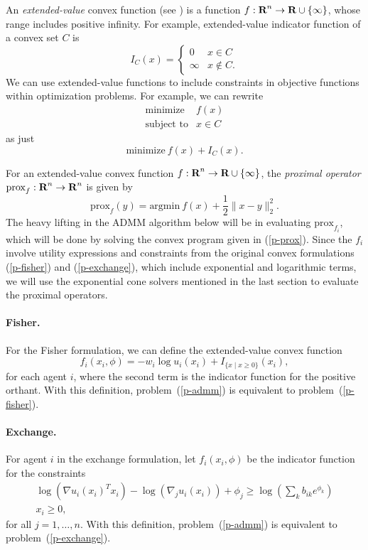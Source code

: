 \documentclass[12pt]{article}
\begin{document}
An \emph{extended-value} convex function (see \cite{BoV:04}) is a function 
$f: {\mbox{\bf R}}^n \to {\mbox{\bf R}} \cup \{\infty\}$, whose range includes
positive infinity. 
For example, extended-value indicator function of a convex set $C$ is
\[
I_C (x) =
\begin{cases}
0 & x \in C\\
\infty & x \not\in C.
\end{cases}
\]
We can use extended-value functions to include constraints in objective functions within
optimization problems. For example,
we can rewrite
\begin{equation*}
\begin{array}{ll}
\mbox{minimize} & f(x) \\
\mbox{subject to} & x \in C
\end{array}
\end{equation*}
as just 
\[
\mbox{minimize}\ f(x) + I_C(x).
\]

For an extended-value convex function
$f: {\mbox{\bf R}}^n \to {\mbox{\bf R}} \cup \{\infty\}$,
the \emph{proximal operator} \cite{parikh2013proximal}
$\mbox{prox}_{f} : {\mbox{\bf R}}^n \to {\mbox{\bf R}}^n$
is given by
\begin{equation}
\label{p-prox}
\mbox{prox}_f(y) = \mbox{argmin}\ f(x) + \frac{1}{2}\|x - y\|_2^2.
\end{equation}
The heavy lifting in the ADMM algorithm below
will be in evaluating $\mbox{prox}_{f_i}$, which will be done
by solving the convex program given in (\ref{p-prox}). Since the $f_i$ involve
utility expressions and constraints from the original convex formulations
(\ref{p-fisher}) and (\ref{p-exchange}), which include
exponential and logarithmic terms, we will use the exponential cone solvers
mentioned in the last section to evaluate the proximal operators.


\paragraph{Fisher.}
For the Fisher formulation, we can define the extended-value convex function
\[
f_i(x_i, \phi) = -w_i \log u_i(x_i) + I_{\lbrace x \mid x \geq 0 \rbrace}(x_i),
\]
for each agent $i$,
where the second term is the indicator function for the positive orthant.
With this definition, problem~(\ref{p-admm}) is equivalent to
problem~(\ref{p-fisher}).

\paragraph{Exchange.}
For agent $i$ in the exchange formulation, let $f_i(x_i, \phi)$ be the indicator function for the
constraints
\[
\begin{array}{c}
\log(\nabla u_i(x_i)^T x_i) - \log(\nabla_j u_i(x_i)) + \phi_j \geq  \log\left(\sum_k b_{ik} e^{\phi_{k}}\right)\\
x_i \geq 0,
\end{array}
\]
for all $j=1,\ldots,n$.
With this definition, problem~(\ref{p-admm}) is equivalent to problem~(\ref{p-exchange}).
\end{document}
